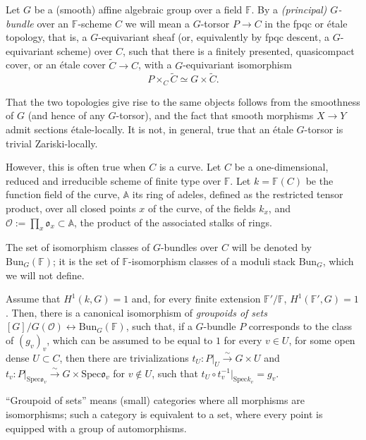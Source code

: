 Let $G$ be a (smooth) affine algebraic group over a field $\mathbb F$. 
By a \emph{(principal) $G$-bundle} over an $\mathbb F$-scheme $C$ we will mean a $G$-torsor $P\to C$ in the fpqc or \'etale topology, that is, a $G$-equivariant sheaf (or, equivalently by fpqc descent, a $G$-equivariant scheme) over $C$, such that there is a finitely presented, quasicompact cover, or an \'etale cover  $\tilde C\to C$, with a $G$-equivariant isomorphism
$$ P\times_C \tilde C \simeq G \times \tilde C.$$

That the two topologies give rise to the same objects follows from the smoothness of $G$ (and hence of any $G$-torsor), and the fact that smooth morphisms $X\to Y$ admit sections \'etale-locally. It is not, in general, true that an \'etale $G$-torsor is trivial Zariski-locally.



However, this is often true when $C$ is a curve. Let $C$ be a one-dimensional, reduced and irreducible scheme of finite type over $\mathbb F$. Let $k = \mathbb F(C)$ be the function field of the curve, $\mathbb A$ its ring of adeles, defined as the restricted tensor product, over all closed points $x$ of the curve, of the fields $k_x$, and $\mathcal O:= \prod_x \mathfrak o_x\subset \mathbb A$, the product of the associated stalks of rings. 





The set of isomorphism classes of $G$-bundles over $C$ will be denoted by $\text{Bun}_G(\mathbb F)$; it is the set of $\mathbb F$-isomorphism classes of a moduli stack $\text{Bun}_G$, which we will not define.


\begin{proposition}
 \label{proposition-BunG}
Assume that $H^1(k,G)=1$ and, for every finite extension $\mathbb F'/\mathbb F$, $H^1(\mathbb F',G)=1$. Then, 
there is a canonical isomorphism of \emph{groupoids of sets} $[G]/G(\mathcal O) \leftrightarrow \text{Bun}_G(\mathbb F)$, such that, if a $G$-bundle $P$ corresponds to the class of $(g_v)_v$, which can be assumed to be equal to $1$ for every $v\in U$, for some open dense $U\subset C$, then there are trivializations $t_U: P|_U\xrightarrow\sim G\times U$ and $t_v: P|_{\text{Spec} \mathfrak o_v} \xrightarrow\sim G\times \text{Spec} \mathfrak o_v$ for $v\notin U$, such that $t_U \circ t_v^{-1}|_{\text{Spec} k_v} = g_v$.
\end{proposition}

``Groupoid of sets'' means (small) categories where all morphisms are isomorphisms; such a category is equivalent to a set, where every point is equipped with a group of automorphisms.


